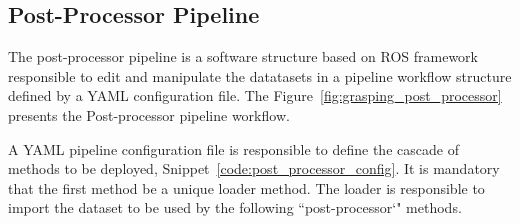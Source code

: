 \subsection{Post-Processor Pipeline}
\label{cap4:modular_grasping_architecture:sec:grasping_synthesis:subsec:post_processor}

The post-processor pipeline is a software structure based on \ac{ROS} framework responsible to edit and manipulate the datatasets in a pipeline workflow structure defined by a YAML configuration file. The Figure~\ref{fig:grasping_post_processor} presents the Post-processor pipeline workflow.

\begin{figure}[h!]
\end{figure}

A YAML pipeline configuration file is responsible to define the cascade of methods to be deployed, Snippet~\ref{code:post_processor_config}. It is mandatory that the first method be a unique loader method. The loader is responsible to import the dataset to be used by the following ``post-processor`" methods.

\begin{snippet}[h!]
\centering
{}
\caption{Post-processor pipeline configuration example.}
\label{code:post_processor_config}
\end{snippet}



